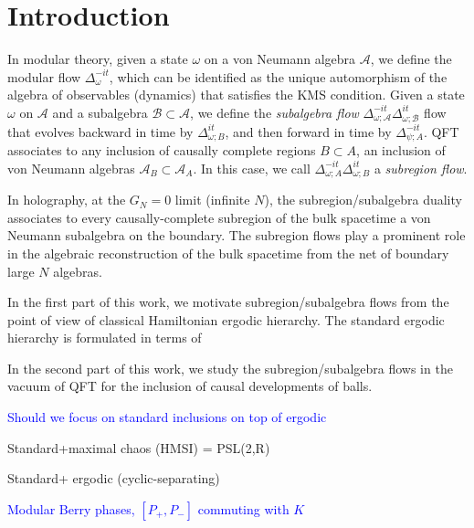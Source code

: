 \documentclass[a4paper,11pt]{article}
\theoremstyle{definition}
\newcommand{\mA}{\mathcal{A}}
\newcommand{\NL}[1]{\textcolor{blue}{#1}}
\begin{document}

\maketitle


\section{Introduction}

In modular theory, given a state $\omega$ on a von Neumann algebra $\mA$, we define the modular flow $\Delta_\omega^{-it}$, which can be identified as the unique automorphism of the algebra of observables (dynamics) that satisfies the KMS condition. Given a state $\omega$ on $\mA$ and a subalgebra $\mathcal{B}\subset \mA$, we define the {\it subalgebra flow} $\Delta_{\omega;\mA}^{-it}\Delta_{\omega;\mathcal{B}}^{it}$ flow that evolves backward in time by $\Delta_{\omega;B}^{it}$, and then forward in time by $\Delta_{\psi;A}^{-it}$. QFT associates to any inclusion of causally complete regions $B\subset A$, an inclusion of von Neumann algebras $\mA_B\subset \mA_A$. In this case, we call $\Delta_{\omega;A}^{-it}\Delta_{\omega;B}^{it}$ a {\it subregion flow}.

In holography, at the $G_N=0$ limit (infinite $N$), the subregion/subalgebra duality associates to every causally-complete subregion of the bulk spacetime a von Neumann subalgebra on the boundary. The subregion flows play a prominent role in the algebraic reconstruction of the bulk spacetime from the net of boundary large $N$ algebras. 

In the first part of this work, we motivate subregion/subalgebra flows from the point of view of classical Hamiltonian ergodic hierarchy. The standard ergodic hierarchy is formulated in terms of 

In the second part of this work, we study the subregion/subalgebra flows in the vacuum of QFT for the inclusion of causal developments of balls.




\NL{Should we focus on standard inclusions on top of ergodic}

Standard+maximal chaos (HMSI)  = PSL(2,R)

Standard+ ergodic (cyclic-separating)

\NL{Modular Berry phases, $[P_+,P_-]$ commuting with $K$}
\end{document}
